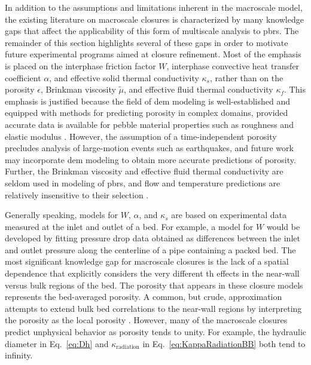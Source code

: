 In addition to the assumptions and limitations inherent in the macroscale model, the existing literature on macroscale closures is characterized by many knowledge gaps that affect the applicability of this form of multiscale analysis to \glspl{pbr}. The remainder of this section highlights several of these gaps in order to motivate future experimental programs aimed at closure refinement. Most of the emphasis is placed on the interphase friction factor \(W\), interphase convective heat transfer coefficient \(\alpha\), and effective solid thermal conductivity \(\kappa_s\), rather than on the porosity \(\epsilon\), Brinkman viscosity \(\tilde{\mu}\), and effective fluid thermal conductivity \(\kappa_f\). This emphasis is justified because the field of \gls{dem} modeling is well-established and equipped with methods for predicting porosity in complex domains, provided accurate data is available for pebble material properties such as roughness and elastic modulus \cite{lammps,openfoam,liggghts,zhang2001}. However, the assumption of a time-independent porosity precludes analysis of large-motion events such as earthquakes, and future work may incorporate \gls{dem} modeling to obtain more accurate predictions of porosity. Further, the Brinkman viscosity and effective fluid thermal conductivity are seldom used in modeling of \glspl{pbr}, and flow and temperature predictions are relatively insensitive to their selection \cite{auwerda_2011,tecdoc1163}.

Generally speaking, models for \(W\), \(\alpha\), and \(\kappa_s\) are based on experimental data measured at the inlet and outlet of a bed. For example, a model for \(W\) would be developed by fitting pressure drop data obtained as differences between the inlet and outlet pressure along the centerline of a pipe containing a packed bed. The most significant knowledge gap for macroscale closures is the lack of a spatial dependence that explicitly considers the very different \gls{th} effects in the near-wall versus bulk regions of the bed. The porosity that appears in these closure models represents the bed-averaged porosity. A common, but crude, approximation attempts to extend bulk bed correlations to the near-wall regions by interpreting the porosity as the local porosity \cite{kaviany, vortmeyer, giese, vafai}. However, many of the macroscale closures predict unphysical behavior as porosity tends to unity. For example, the hydraulic diameter in Eq.\ \eqref{eq:Dh} and \(\kappa_\text{radiation}\) in Eq.\ \eqref{eq:KappaRadiationBB} both tend to infinity.

